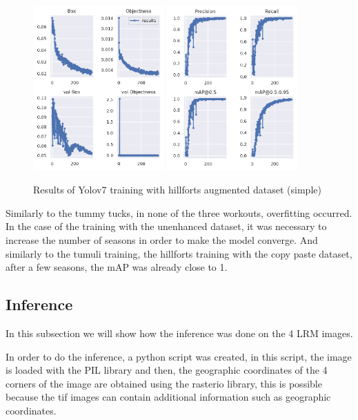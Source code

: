 \begin{figure}[H]
    \centering
    {{\includegraphics[width=5cm]{images/training/castros/maia1.png} }}
    \qquad
    {{\includegraphics[width=5cm]{images/training/castros/maia2.png} }}
    \caption{Results of Yolov7 training with hillforts augmented dataset (simple)}
    \label{fig:example}
\end{figure}

Similarly to the tummy tucks, in none of the three workouts, overfitting occurred. In the case of the training with the unenhanced dataset, it was necessary to increase the number of seasons in order to make the model converge. And similarly to the tumuli training, the hillforts training with the copy paste dataset, after a few seasons, the mAP was already close to 1.

\subsection{Inference}
In this subsection we will show how the inference was done on the 4 LRM images.

In order to do the inference, a python script was created, in this script, the image is loaded with the PIL library and then, the geographic coordinates of the 4 corners of the image are obtained using the rasterio library, this is possible because the tif images can contain additional information such as geographic coordinates. 

